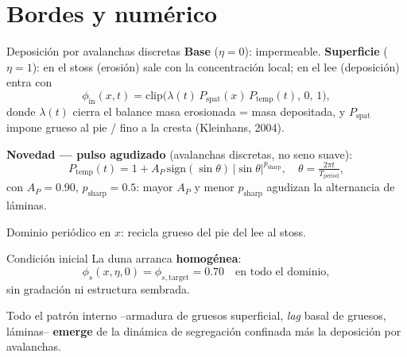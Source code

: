 \documentclass[11pt]{beamer}
\begin{document}
\section{Bordes y numérico}

\begin{frame}{Deposición por avalanchas discretas}
\textbf{Base} ($\eta=0$): impermeable. \textbf{Superficie} ($\eta=1$): en el stoss (erosión) sale con la concentración local; en el lee (deposición) entra con
\begin{equation}
    \phi_{\mathrm{in}}(x,t) = \mathrm{clip}\big(\lambda(t)\,P_{\mathrm{spat}}(x)\,P_{\mathrm{temp}}(t),\,0,\,1\big),
\end{equation}
donde $\lambda(t)$ cierra el balance masa erosionada = masa depositada, y $P_{\mathrm{spat}}$ impone grueso al pie / fino a la cresta (Kleinhans, 2004).

\vspace{4pt}
\textbf{Novedad — pulso agudizado} (avalanchas discretas, no seno suave):
\begin{equation}
    P_{\mathrm{temp}}(t) = 1 + A_P\,\mathrm{sign}(\sin\theta)\,|\sin\theta|^{p_{\mathrm{sharp}}}, \quad \theta=\tfrac{2\pi t}{T_{\mathrm{period}}},
\end{equation}
con $A_P=0.90$, $p_{\mathrm{sharp}}=0.5$: mayor $A_P$ y menor $p_{\mathrm{sharp}}$ agudizan la alternancia de láminas.

\vspace{2pt}
Dominio periódico en $x$: recicla grueso del pie del lee al stoss.
\end{frame}

\begin{frame}{Condición inicial}
La duna arranca \textbf{homogénea}:
\begin{equation}
    \phi_s(x,\eta,0) = \phi_{s,\mathrm{target}} = 0.70 \quad \text{en todo el dominio},
\end{equation}
sin gradación ni estructura sembrada.

\vspace{6pt}
Todo el patrón interno --armadura de gruesos superficial, \emph{lag} basal de gruesos, láminas-- \textbf{emerge} de la dinámica de segregación confinada más la deposición por avalanchas.
\end{frame}
\end{document}
